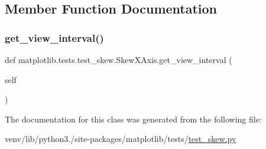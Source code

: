 \subsection{Member Function Documentation}
\mbox{\label{classmatplotlib_1_1tests_1_1test__skew_1_1SkewXAxis_a701e289f28beed80fc7b72ba59572cf2}} 
\subsubsection{\texorpdfstring{get\+\_\+view\+\_\+interval()}{get\_view\_interval()}}
{\footnotesize\ttfamily def matplotlib.\+tests.\+test\+\_\+skew.\+Skew\+X\+Axis.\+get\+\_\+view\+\_\+interval (\begin{DoxyParamCaption}\item[{}]{self }\end{DoxyParamCaption})}



The documentation for this class was generated from the following file\+:\begin{DoxyCompactItemize}
\item 
venv/lib/python3./site-\/packages/matplotlib/tests/\hyperlink{test__skew_8py}{test\+\_\+skew.\+py}\end{DoxyCompactItemize}
